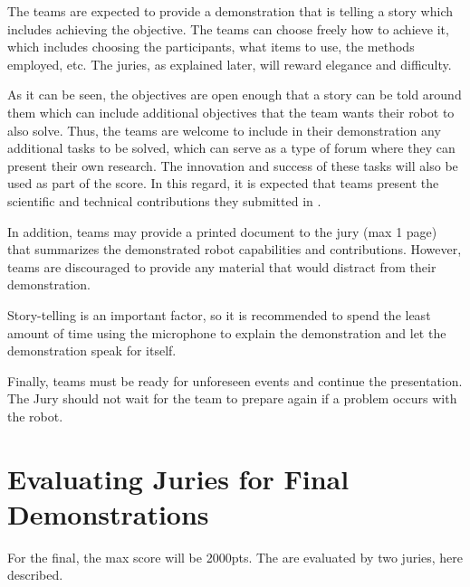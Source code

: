 

The teams are expected to provide a demonstration that is telling a story which includes achieving the objective. The teams can choose freely how to achieve it, which includes choosing the participants, what items to use, the methods employed, etc. The juries, as explained later, will reward elegance and difficulty.

As it can be seen, the objectives are open enough that a story can be told around them which can include additional objectives that the team wants their robot to also solve. Thus, the teams are welcome to include in their demonstration any additional tasks to be solved, which can serve as a type of forum where they can present their own research. The innovation and success of these tasks will also be used as part of the score. In this regard, it is expected that teams present the scientific and technical contributions they submitted in .

In addition, teams may provide a printed document to the jury (max 1 page) that summarizes the demonstrated robot capabilities and contributions. However, teams are discouraged to provide any material that would distract from their demonstration.

Story-telling is an important factor, so it is recommended to spend the least amount of time using the microphone to explain the demonstration and let the demonstration speak for itself.

Finally, teams must be ready for unforeseen events and continue the presentation. The Jury should not wait for the team to prepare again if a problem occurs with the robot.


\section{Evaluating Juries for Final Demonstrations}
For the final, the max score will be 2000pts.
The  are evaluated by two juries, here described.

